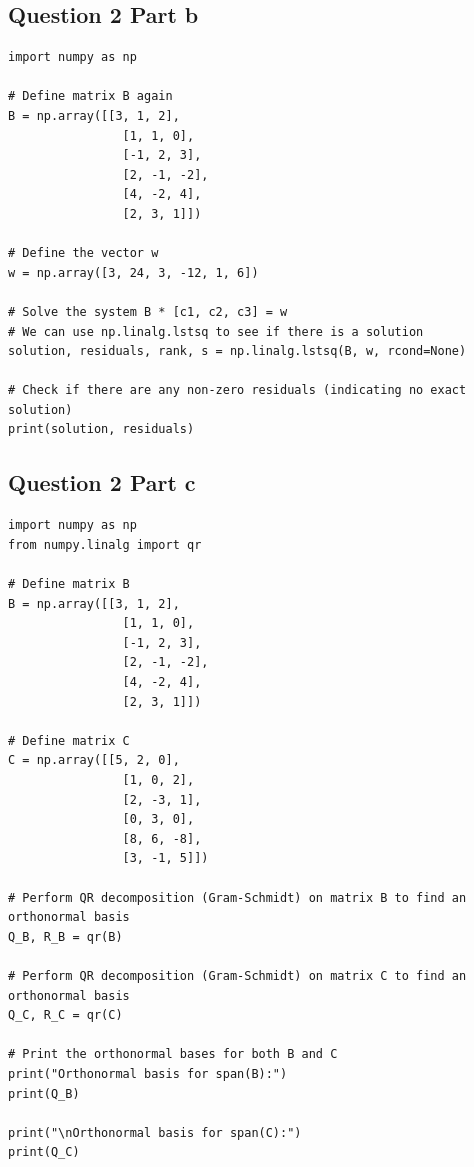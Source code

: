 \documentclass{article}
\begin{document}
\subsection*{Question 2 Part b}
\begin{lstlisting}[style=pythonstyle]
import numpy as np

# Define matrix B again
B = np.array([[3, 1, 2],
                [1, 1, 0],
                [-1, 2, 3],
                [2, -1, -2],
                [4, -2, 4],
                [2, 3, 1]])

# Define the vector w
w = np.array([3, 24, 3, -12, 1, 6])

# Solve the system B * [c1, c2, c3] = w
# We can use np.linalg.lstsq to see if there is a solution
solution, residuals, rank, s = np.linalg.lstsq(B, w, rcond=None)

# Check if there are any non-zero residuals (indicating no exact solution)
print(solution, residuals)        
\end{lstlisting}

\subsection*{Question 2 Part c}
\begin{lstlisting}[style=pythonstyle]
import numpy as np
from numpy.linalg import qr

# Define matrix B
B = np.array([[3, 1, 2],
                [1, 1, 0],
                [-1, 2, 3],
                [2, -1, -2],
                [4, -2, 4],
                [2, 3, 1]])

# Define matrix C
C = np.array([[5, 2, 0],
                [1, 0, 2],
                [2, -3, 1],
                [0, 3, 0],
                [8, 6, -8],
                [3, -1, 5]])

# Perform QR decomposition (Gram-Schmidt) on matrix B to find an orthonormal basis
Q_B, R_B = qr(B)

# Perform QR decomposition (Gram-Schmidt) on matrix C to find an orthonormal basis
Q_C, R_C = qr(C)

# Print the orthonormal bases for both B and C
print("Orthonormal basis for span(B):")
print(Q_B)

print("\nOrthonormal basis for span(C):")
print(Q_C)
       
\end{lstlisting}
\end{document}
